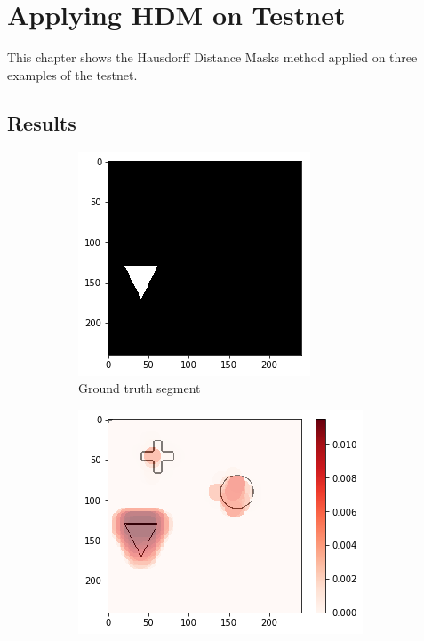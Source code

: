 \section{Applying HDM on Testnet}

This chapter shows the Hausdorff Distance Masks method applied on three examples of the testnet.

\subsection{Results}
\begin{figure}[H]
    \centering
    \begin{subfigure}[t]{.28\textwidth}
        \centering
        \includegraphics[width=\linewidth]{chapters/06_hdm/testnet/0.png}
        \caption{Ground truth segment}
    \end{subfigure}\hfill%
    \begin{subfigure}[t]{.34\textwidth}
        \centering
        \includegraphics[width=\linewidth]{chapters/06_hdm/testnet/2.png}

\end{subfigure}
\end{figure}
